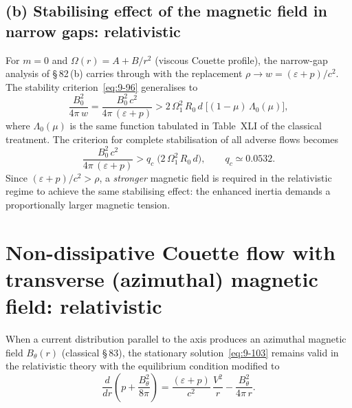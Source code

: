 \subsection*{(b) Stabilising effect of the magnetic field in narrow
  gaps: relativistic}
\label{sec:rel-82b}

For $m=0$ and $\Omega(r) = A + B/r^{2}$ (viscous Couette profile),
the narrow-gap analysis of \S\,82\,(b) carries through with the
replacement $\rho\to w = (\varepsilon+p)/c^{2}$.  The stability
criterion~\eqref{eq:9-96} generalises to
\begin{equation}
  \frac{B_{0}^{2}}{4\pi\,w}
  = \frac{B_{0}^{2}\,c^{2}}{4\pi\,(\varepsilon + p)}
  > 2\,\Omega_{1}^{2}\,R_{0}\,d\;
    \bigl[(1-\mu)\,\Lambda_{0}(\mu)\bigr],
  \label{eq:rel-9-96}
\end{equation}
where $\Lambda_{0}(\mu)$ is the same function tabulated in Table~XLI
of the classical treatment.  The criterion for complete stabilisation
of all adverse flows becomes
\begin{equation}
  \frac{B_{0}^{2}\,c^{2}}{4\pi\,(\varepsilon + p)}
  > q_{c}\;\bigl(2\,\Omega_{1}^{2}\,R_{0}\,d\bigr),
  \qquad q_{c} \simeq 0.0532.
  \label{eq:rel-9-100}
\end{equation}
Since $(\varepsilon+p)/c^{2} > \rho$, a \emph{stronger} magnetic field
is required in the relativistic regime to achieve the same
stabilising effect: the enhanced inertia demands a proportionally
larger magnetic tension.

\section{Non-dissipative Couette flow with transverse (azimuthal)
  magnetic field: relativistic}
\label{sec:rel-83}

When a current distribution parallel to the axis produces an
azimuthal magnetic field $B_{\theta}(r)$ (classical \S\,83), the
stationary solution~\eqref{eq:9-103} remains valid in the
relativistic theory with the equilibrium condition modified to
\begin{equation}
  \frac{d}{dr}\!\left(p + \frac{B_{\theta}^{2}}{8\pi}\right)
  = \frac{(\varepsilon + p)}{c^{2}}\,\frac{V^{2}}{r}
    - \frac{B_{\theta}^{2}}{4\pi\,r}.
  \label{eq:rel-9-104}
\end{equation}

